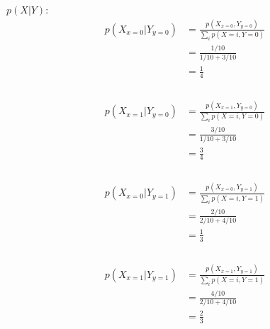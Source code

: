 \documentclass[12pt, fullpage,letterpaper]{article}
\begin{document}
\begin{enumerate}
\begin{enumerate}
\begin{enumerate}
            $p(X|Y)$:
            \[
            	\begin{split}
            		p(X_{x=0}|Y_{y=0}) &= \frac{p(X_{x=0},Y_{y=0})}{\sum_i p(X=i, Y=0)} 
            			\\
            			&= \frac{1/10}{1/10 + 3/10}
            			\\
            			&= \boxed{\frac{1}{4}}
            			\\
            	\end{split}
            \]
            \\
            \[
            	\begin{split}
            		p(X_{x=1}|Y_{y=0}) &= \frac{p(X_{x=1},Y_{y=0})}{\sum_i p(X=i, Y=0)} 
            			\\
            			&= \frac{3/10}{1/10 + 3/10}
            			\\
            			&= \boxed{\frac{3}{4}}
            			\\
            	\end{split}
            \]
            \\
            \[
            	\begin{split}
            		p(X_{x=0}|Y_{y=1}) &= \frac{p(X_{x=0},Y_{y=1})}{\sum_i p(X=i, Y=1)} 
            			\\
            			&= \frac{2/10}{2/10 + 4/10}
            			\\
            			&= \boxed{\frac{1}{3}}
            			\\
            	\end{split}
            \]
            \\
            \[
            	\begin{split}
            		p(X_{x=1}|Y_{y=1}) &= \frac{p(X_{x=1},Y_{y=1})}{\sum_i p(X=i, Y=1)} 
            			\\
            			&= \frac{4/10}{2/10 + 4/10}
            			\\
            			&= \boxed{\frac{2}{3}}
            			\\
            	\end{split}
            \]
            \\
            

\end{enumerate}
\end{enumerate}
\end{enumerate}
\end{document}
